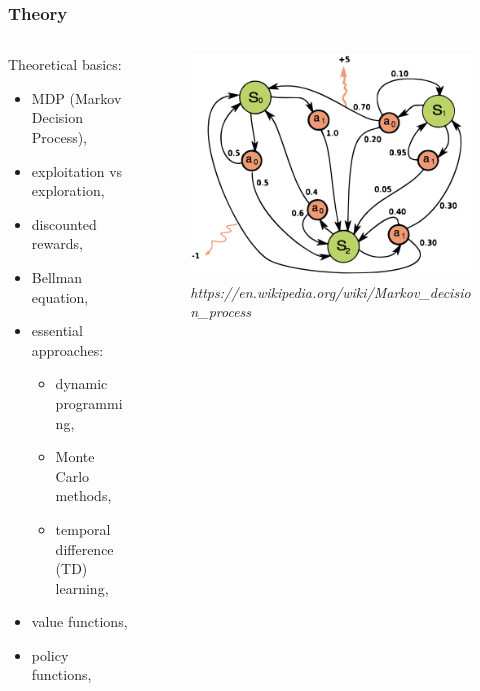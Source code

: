\begin{frame}
  \frametitle{Theory}

  \begin{columns}
    \begin{column}{0.5\textwidth}
      Theoretical basics:
      \begin{itemize}
        \item{MDP (Markov Decision Process),}
        \item{exploitation vs exploration,}
        \item{discounted rewards,}
        \item{Bellman equation,}
        \item{essential approaches:}
          \begin{itemize}
            \item{dynamic programming,}
            \item{Monte Carlo methods,}
            \item{temporal difference (TD) learning,}
          \end{itemize}
        \item{value functions,}
        \item{policy functions,}
      \end{itemize}
    \end{column}

    \begin{column}{0.35\textwidth}
      \begin{figure}
        \includegraphics[width=\textwidth]{imgs/mdp.png}
        \caption{\tiny \textit{https://en.wikipedia.org/wiki/Markov\_decision\_process}}
      \end{figure}
    \end{column}
  \end{columns}

\end{frame}
